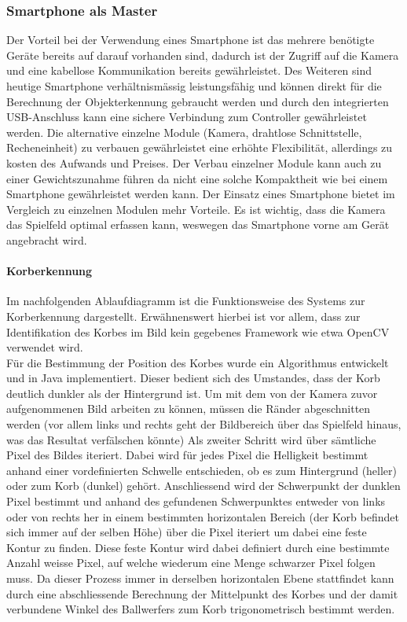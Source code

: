 \subsubsection{Smartphone als Master}
	Der Vorteil bei der Verwendung eines Smartphone ist das mehrere benötigte Geräte bereits auf darauf vorhanden sind, dadurch ist der Zugriff auf die Kamera und eine kabellose Kommunikation bereits gewährleistet. Des Weiteren sind heutige Smartphone verhältnismässig leistungsfähig und können direkt für die Berechnung der Objekterkennung gebraucht werden und durch den integrierten USB-Anschluss kann eine sichere Verbindung zum Controller gewährleistet werden.
	Die alternative einzelne Module (Kamera, drahtlose Schnittstelle, Recheneinheit) zu verbauen gewährleistet eine erhöhte Flexibilität, allerdings zu kosten des Aufwands und Preises. Der Verbau einzelner Module kann auch zu einer Gewichtszunahme führen da nicht eine solche Kompaktheit wie bei einem Smartphone gewährleistet werden kann. 
	Der Einsatz eines Smartphone bietet im Vergleich zu einzelnen Modulen mehr Vorteile. Es ist wichtig, dass die Kamera das Spielfeld optimal erfassen kann, weswegen das Smartphone vorne am Gerät angebracht wird. 
	
	
	
	\paragraph{Korberkennung}
	Im nachfolgenden Ablaufdiagramm ist die Funktionsweise des Systems zur Korberkennung dargestellt. Erwähnenswert hierbei ist vor allem, dass zur Identifikation des Korbes im Bild kein gegebenes Framework wie etwa OpenCV verwendet wird. \\
	Für die Bestimmung der Position des Korbes wurde ein Algorithmus entwickelt und in Java implementiert. Dieser bedient sich des Umstandes, dass der Korb deutlich dunkler als der Hintergrund ist. Um mit dem von der Kamera zuvor aufgenommenen Bild arbeiten zu können, müssen die Ränder abgeschnitten werden (vor allem links und rechts geht der Bildbereich über das Spielfeld hinaus, was das Resultat verfälschen könnte) Als zweiter Schritt wird über sämtliche Pixel des Bildes iteriert. Dabei wird für jedes Pixel die Helligkeit bestimmt anhand einer vordefinierten Schwelle entschieden, ob es zum Hintergrund (heller) oder zum Korb (dunkel) gehört. Anschliessend wird der Schwerpunkt der dunklen Pixel bestimmt und anhand des gefundenen Schwerpunktes entweder von links oder von rechts her in einem bestimmten horizontalen Bereich (der Korb befindet sich immer auf der selben Höhe) über die Pixel iteriert um dabei eine feste Kontur zu finden. Diese feste Kontur wird dabei definiert durch eine bestimmte Anzahl weisse Pixel, auf welche wiederum eine Menge schwarzer Pixel folgen muss. Da dieser Prozess immer in derselben horizontalen Ebene stattfindet kann durch eine abschliessende Berechnung der Mittelpunkt des Korbes und der damit verbundene Winkel des Ballwerfers zum Korb trigonometrisch bestimmt werden.\\
	